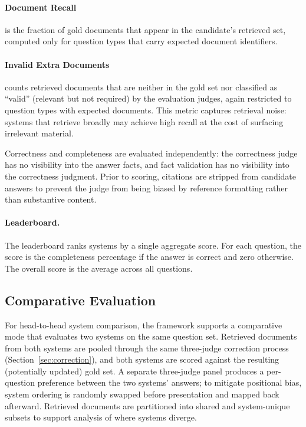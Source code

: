 \documentclass{article}
\begin{document}
\paragraph{Document Recall} is the fraction of gold documents that appear in the candidate's retrieved set, computed only for question types that carry expected document identifiers.

\paragraph{Invalid Extra Documents} counts retrieved documents that are neither in the gold set nor classified as ``valid'' (relevant but not required) by the evaluation judges, again restricted to question types with expected documents. This metric captures retrieval noise: systems that retrieve broadly may achieve high recall at the cost of surfacing irrelevant material.

Correctness and completeness are evaluated independently: the correctness judge has no visibility into the answer facts, and fact validation has no visibility into the correctness judgment. Prior to scoring, citations are stripped from candidate answers to prevent the judge from being biased by reference formatting rather than substantive content.

\paragraph{Leaderboard.} The leaderboard ranks systems by a single aggregate score. For each question, the score is the completeness percentage if the answer is correct and zero otherwise. The overall score is the average across all questions.

\subsection{Comparative Evaluation}
\label{sec:comparative}

For head-to-head system comparison, the framework supports a comparative mode that evaluates two systems on the same question set. Retrieved documents from both systems are pooled through the same three-judge correction process (Section~\ref{sec:correction}), and both systems are scored against the resulting (potentially updated) gold set. A separate three-judge panel produces a per-question preference between the two systems' answers; to mitigate positional bias, system ordering is randomly swapped before presentation and mapped back afterward. Retrieved documents are partitioned into shared and system-unique subsets to support analysis of where systems diverge.
\end{document}

